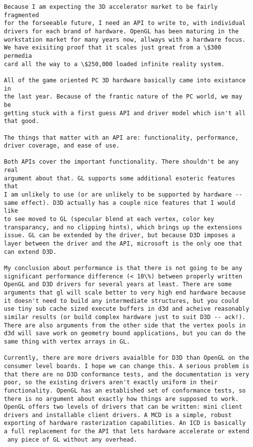 \begin{verbatim}
Because I am expecting the 3D accelerator market to be fairly fragmented
for the forseeable future, I need an API to write to, with individual 
drivers for each brand of hardware. OpenGL has been maturing in the 
workstation market for many years now, allways with a hardware focus. 
We have exisiting proof that it scales just great from a \$300 permedia 
card all the way to a \$250,000 loaded infinite reality system. 

All of the game oriented PC 3D hardware basically came into existance in
the last year. Because of the frantic nature of the PC world, we may be 
getting stuck with a first guess API and driver model which isn't all 
that good. 

The things that matter with an API are: functionality, performance, 
driver coverage, and ease of use. 

Both APIs cover the important functionality. There shouldn't be any real 
argument about that. GL supports some additional esoteric features that 
I am unlikely to use (or are unlikely to be supported by hardware -- 
same effect). D3D actually has a couple nice features that I would like 
to see moved to GL (specular blend at each vertex, color key 
transparancy, and no clipping hints), which brings up the extensions 
issue. GL can be extended by the driver, but because D3D imposes a 
layer between the driver and the API, microsoft is the only one that 
can extend D3D.  

My conclusion about performance is that there is not going to be any 
significant performance difference (< 10\%) between properly written 
OpenGL and D3D drivers for several years at least. There are some 
arguments that gl will scale better to very high end hardware because
it doesn't need to build any intermediate structures, but you could 
use tiny sub cache sized execute buffers in d3d and acheive reasonably
similar results (or build complex hardware just to suit D3D -- ack!). 
There are also arguments from the other side that the vertex pools in 
d3d will save work on geometry bound applications, but you can do the 
same thing with vertex arrays in GL. 

Currently, there are more drivers avaialble for D3D than OpenGL on the 
consumer level boards. I hope we can change this. A serious problem is
that there are no D3D conformance tests, and the documentation is very 
poor, so the existing drivers aren't exactly uniform in their 
functionality. OpenGL has an established set of conformance tests, so 
there is no argument about exactly how things are supposed to work. 
OpenGL offers two levels of drivers that can be written: mini client 
drivers and installable client drivers. A MCD is a simple, robust 
exporting of hardware rasterization capabilities. An ICD is basically 
a full replacement for the API that lets hardware accelerate or extend
 any piece of GL without any overhead. 


\end{verbatim}
